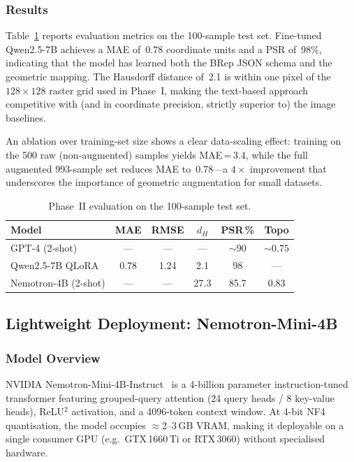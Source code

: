 \documentclass[journal]{IEEEtran}
\begin{document}
\subsubsection{Results}

Table~\ref{tab:phase2_results} reports evaluation metrics on the 100-sample
test set.  Fine-tuned Qwen2.5-7B achieves a MAE of~0.78 coordinate units and
a PSR of~98\%, indicating that the model has learned both the BRep JSON schema
and the geometric mapping.  The Hausdorff distance of~2.1 is within one pixel
of the $128 \times 128$ raster grid used in Phase~I, making the text-based
approach competitive with (and in coordinate precision, strictly superior to)
the image baselines.

An ablation over training-set size shows a clear data-scaling effect: training
on the 500 raw (non-augmented) samples yields MAE\,=\,3.4, while the full
augmented 993-sample set reduces MAE to~0.78—a $4\times$ improvement that
underscores the importance of geometric augmentation for small datasets.

\begin{table}[!t]
\centering
\caption{Phase~II evaluation on the 100-sample test set.}
\label{tab:phase2_results}
\footnotesize
\begin{tabular}{@{}lccccc@{}}
\toprule
\textbf{Model} & \textbf{MAE} & \textbf{RMSE} & \textbf{$d_H$} & \textbf{PSR\,\%} & \textbf{Topo} \\
\midrule
GPT-4 (2-shot)       & ---  & ---  & ---  & ${\sim}90$ & ${\sim}0.75$ \\
Qwen2.5-7B QLoRA     & 0.78 & 1.24 & 2.1  & 98         & ---          \\
Nemotron-4B (2-shot) & ---  & ---  & 27.3 & 85.7       & 0.83         \\
\bottomrule
\end{tabular}
\end{table}

\subsection{Lightweight Deployment: Nemotron-Mini-4B}
\label{sec:phase2_nemotron}

\subsubsection{Model Overview}

NVIDIA Nemotron-Mini-4B-Instruct~\cite{nvidia2024nemotron} is a 4-billion
parameter instruction-tuned transformer featuring grouped-query attention
(24 query heads / 8 key-value heads), ReLU$^2$ activation, and a 4096-token
context window.  At 4-bit NF4 quantisation, the model occupies
$\approx$2--3\,GB VRAM, making it deployable on a single consumer GPU
(e.g.\ GTX\,1660\,Ti or RTX\,3060) without specialised hardware.
\end{document}
